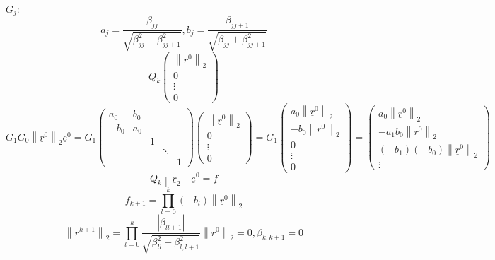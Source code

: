 \documentclass{article}
\newcommand{\abs}[1]{\left|#1\right|}
\newcommand{\norm}[1]{\left\|#1\right\|}
\begin{document}
$G_j$:
\[
  a_j = \frac{\beta_{jj}}{\sqrt{\beta_{jj}^2 + \beta_{jj+1}^2}},
  b_j = \frac{\beta_{jj+1}}{\sqrt{\beta_{jj} + \beta_{jj+1}^2}}
\]
\[ Q_k \begin{pmatrix} \norm{\underline r^0}_2 \\ 0 \\ \vdots \\ 0 \end{pmatrix} \]
\[
  G_1 G_0 \norm{\underline r^0}_2 \underline e^0
  = G_1   \begin{pmatrix}
    a_0 & b_0 &    &        & \\
    -b_0 & a_0 &   &        & \\
        &     & 1  &        & \\
        &     &    & \ddots & \\
        &     &    &        & 1
  \end{pmatrix}
  \begin{pmatrix} \norm{\underline r^0}_2 \\ 0 \\ \vdots \\ 0 \end{pmatrix}
  = G_1 \begin{pmatrix} a_0 \norm{\underline r^0}_2 \\ -b_0 \norm{\underline r^0}_2 \\ 0 \\ \vdots \\ 0 \end{pmatrix}
  = \begin{pmatrix} a_0 \norm{\underline r^0}_2 \\ -a_1 b_0 \norm{\underline r^0}_2 \\ (-b_1)(-b_0) \norm{\underline r^0}_2 \\ \vdots \end{pmatrix}
\]
\[ Q_k \norm{\underline r_2} \underline e^0 = \underline f \]
\[ f_{k+1} = \prod_{l=0}^k (-b_l) \norm{\underline r^0}_2 \]
\[ \norm{\underline r^{k+1}}_2 = \prod_{l=0}^k \frac{\abs{\beta_{ll+1}}}{\sqrt{\beta_{ll}^2 + \beta_{l,l+1}^2}} \norm{\underline r^0}_2 = 0, \beta_{k,k+1} = 0 \]
\end{document}
